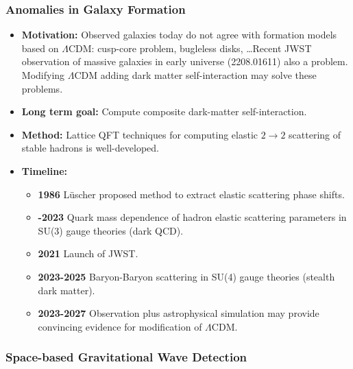 \documentclass[12pt,hyperpdf]{article}
\begin{document}
\subsubsection{Anomalies in Galaxy Formation}

\begin{itemize}
   \item{ \bf Motivation:} Observed galaxies today do not agree with formation models based on $\Lambda$CDM: cusp-core problem, bugleless disks, \dots Recent JWST observation of massive galaxies in early universe (2208.01611) also a problem.  Modifying $\Lambda$CDM adding dark matter self-interaction may solve these problems.
   \item {\bf Long term goal:} Compute composite dark-matter self-interaction.
   \item{ \bf Method:} Lattice QFT techniques for computing elastic $2 \to 2$ scattering of stable hadrons is well-developed.
\item{\bf Timeline:}
\begin{itemize}
   \item {\bf 1986} L\"uscher proposed method to extract elastic scattering phase shifts.
    \item {\bf -2023} Quark mass dependence of hadron elastic scattering parameters in SU(3) gauge theories (dark QCD).
   \item{\bf 2021} Launch of JWST. 
   \item {\bf 2023-2025} Baryon-Baryon scattering in SU(4) gauge theories (stealth dark matter).
   \item {\bf 2023-2027} Observation plus astrophysical simulation may provide convincing evidence for modification of $\Lambda$CDM.
\end{itemize}
\end{itemize}

\subsubsection{Space-based Gravitational Wave Detection}
\end{document}
